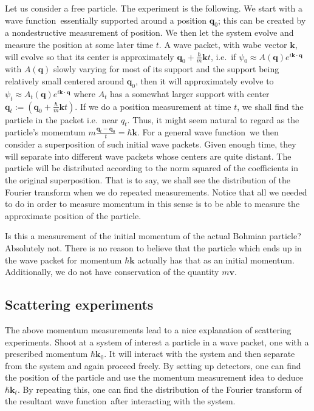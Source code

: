 \documentclass[11pt]{article}
\theoremstyle{remark}
\begin{document}
Let us consider a free particle. The experiment is the following. We
start with a wave function\ essentially supported around a position
$\boldsymbol{q}_0$; this 
can be created by
a nondestructive measurement of position. We then let
the system evolve and measure the position at some later time
$t$. A wave packet, with wabe vector $\boldsymbol k$, will evolve
so that its center is approximately $\boldsymbol{q}_0 +
\frac{\ensuremath{\hbar}}{m}\boldsymbol k 
t$, i.e.\ if $\ensuremath{\psi}_0 \approx A(\boldsymbol{q}) e^{{i}
  \boldsymbol k \cdot \boldsymbol{q}}  $ 
with $A(\boldsymbol{q})$ slowly varying for most of its support and
the support 
being relatively small centered around $\boldsymbol{q}_0$, 
then it will approximately evolve to $\ensuremath{\psi}_t \approx A_t(\boldsymbol{q})
e^{{i} \boldsymbol k \cdot \boldsymbol{q}} $ where 
$A_t$ has a somewhat larger support with  center 
$\boldsymbol{q}_t \ensuremath{:=} (\boldsymbol{q}_0
+\frac{\hbar}{m}\boldsymbol k t)$. If we do a position measurement at time
$t$, we
shall find the particle in the packet i.e.\ near $q_t$. Thus,
 it might seem natural to regard as the particle's momemtum 
 $m \frac{\boldsymbol{q}_t -
   \boldsymbol{q}_0}{t} = \hbar \boldsymbol{k} $. For
a general wave function\ we then consider a superposition of such  initial wave
packets. Given enough time, they will separate into different wave
packets whose centers are quite distant. The particle will be
distributed according to the norm squared of the coefficients in the
original superposition. That is to say, we shall see the distribution
of the Fourier transform when we do repeated measurements. Notice that
all we needed to do in order to measure momentum in this sense 
is to be able to
measure the approximate position of the particle.


Is this a measurement of the initial momentum of the actual Bohmian
particle? Absolutely not. There is no reason to believe that the
particle which ends up in the wave packet for momentum $\hbar \boldsymbol k$
actually has that as an initial momentum. Additionally, we do not
have conservation of the quantity $m \ensuremath{\boldsymbol{v}}$.  


\subsection{Scattering experiments} 

The above momentum measurements lead to a nice explanation of  
 scattering
experiments. Shoot at a system of interest a particle in
 a wave packet, one with a
prescribed momentum $\hbar \boldsymbol{k}_0$. It will interact
with the system and then separate from the system and again proceed
 freely. By setting up detectors, one can find the position of the
 particle and use the momentum measurement idea to deduce
 $\hbar \boldsymbol{k}_t$. By repeating this, one can find the distribution
 of the Fourier transform of the resultant wave function\ after interacting with
 the system.
\end{document}

